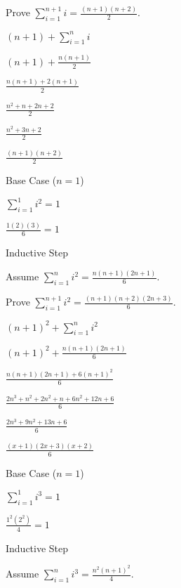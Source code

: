 \documentclass{exam}
\begin{document}
\begin{questions}
\begin{subparts}
\begin{center}
Prove \( \sum_{i=1}^{n+1} i = \frac{(n+1)(n+2)}{2} \).

\( (n+1) + \sum_{i=1}^{n} i \)

\( (n+1) + \frac{n(n+1)}{2} \)

\(  \frac{n(n+1) + 2(n+1)}{2} \)

\(  \frac{n^2 + n + 2n + 2}{2} \)

\(  \frac{n^2 + 3n + 2}{2} \)

\(  \frac{(n+1)(n+2)}{2} \)

\end{center}

\newpage


\begin{center}

Base Case (\(n = 1\))

\(\sum_{i=1}^{1} i^2 = 1\)

\(\frac{1(2)(3)}{6} = 1\)
\vspace{5px}

Inductive Step

Assume \( \sum_{i=1}^{n} i^2 = \frac{n(n+1)(2n+1)}{6} \). 

Prove \(  \sum_{i=1}^{n+1} i^2 = \frac{(n+1)(n+2)(2n+3)}{6} \).

\( (n+1)^2 + \sum_{i=1}^{n} i^2 \)

\( (n+1)^2 + \frac{n(n+1)(2n+1)}{6} \)

\(  \frac{n(n+1)(2n+1) + 6(n+1)^2}{6} \)

\(  \frac{2n^3 + n^2 + 2n^2 + n + 6n^2 + 12n + 6}{6} \)

\(  \frac{2n^3 + 9n^2 + 13n + 6}{6} \)

\(  \frac{(x+1)(2x+3)(x+2)}{6} \)

\end{center}


\begin{center}

Base Case (\(n = 1\))

\(\sum_{i=1}^{1} i^3 = 1\)

\(\frac{1^2(2^2)}{4} = 1\)
\vspace{5px}

Inductive Step

Assume \( \sum_{i=1}^{n} i^3 = \frac{n^2(n+1)^2}{4} \). 


\end{center}
\end{subparts}
\end{questions}
\end{document}
